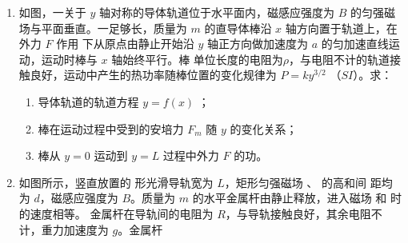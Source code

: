 \begin{enumerate}
\item 
{}
如图，一关于 $ y $ 轴对称的导体轨道位于水平面内，磁感应强度为 $ B $
的匀强磁场与平面垂直。一足够长，质量为 $ m $ 的直导体棒沿 $ x $ 轴方向置于轨道上，在外力 $ F $ 作用
下从原点由静止开始沿 $ y $ 轴正方向做加速度为 $ a $ 的匀加速直线运动，运动时棒与 $ x $ 轴始终平行。棒
单位长度的电阻为$ \rho $，与电阻不计的轨道接触良好，运动中产生的热功率随棒位置的变化规律为
$ P=k y^{3/2} $ （$ SI $）。求：
\begin{enumerate}
\item
导体轨道的轨道方程 $ y=f (x)$
；
\item 
棒在运动过程中受到的安培力 $ F_m $ 随 $ y $ 的变化关系；
\item 
棒从 $ y=0 $ 运动到 $ y=L $ 过程中外力 $ F $ 的功。



\end{enumerate}
\begin{figure}[h!]
\flushright

\end{figure}




\item 
{}
如图所示，竖直放置的 \hlinepicture{} 
形光滑导轨宽为 $ L $，矩形匀强磁场  、  的高和间
距均为 $ d $，磁感应强度为 $ B $。质量为 $ m $ 的水平金属杆由静止释放，进入磁场  和  时的速度相等。
金属杆在导轨间的电阻为 $ R $，与导轨接触良好，其余电阻不计，重力加速度为 $ g $。金属杆  
\begin{figure}[h!]
\centering

\end{figure}


\end{enumerate}
